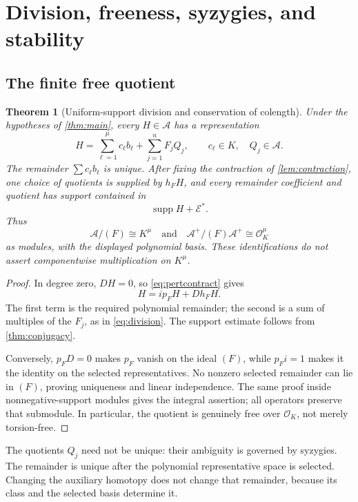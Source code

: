\documentclass[11pt,letterpaper]{article}
\newtheorem{theorem}{Theorem}[section]
\theoremstyle{definition}
\theoremstyle{remark}
\newcommand{\A}{\mathscr A}
\newcommand{\OO}{\mathcal O}
\newcommand{\EE}{\mathcal E}
\newcommand{\supp}{\operatorname{supp}}
\numberwithin{equation}{section}
\begin{document}
\section{Division, freeness, syzygies, and stability}\label{sec:division}
\subsection{The finite free quotient}
\begin{theorem}[Uniform-support division and conservation of colength]\label{thm:division}
Under the hypotheses of \cref{thm:main}, every $H\in\A$ has a representation
\begin{equation}\label{eq:division}
 H=\sum_{\ell=1}^\mu c_\ell b_\ell+\sum_{j=1}^nF_jQ_j,
 \qquad c_\ell\in K,\quad Q_j\in\A.
\end{equation}
The remainder $\sum c_\ell b_\ell$ is unique. After fixing the contraction of \cref{lem:contraction}, one choice of quotients is supplied by $h_FH$, and every remainder coefficient and quotient has support contained in
\begin{equation}\label{eq:supportdivision}
 \supp H+\EE^*.
\end{equation}
Thus
\[
 \A/(F)\cong K^\mu
 \quad\text{and}\quad
 \A^+/(F)\A^+\cong\OO_K^\mu
\]
as modules, with the displayed polynomial basis. These identifications do not assert componentwise multiplication on $K^\mu$.
\end{theorem}
\begin{proof}
In degree zero, $DH=0$, so \eqref{eq:pertcontract} gives
\[
 H=ip_FH+Dh_FH.
\]
The first term is the required polynomial remainder; the second is a sum of multiples of the $F_j$, as in \eqref{eq:division}. The support estimate follows from \cref{thm:conjugacy}.

Conversely, $p_FD=0$ makes $p_F$ vanish on the ideal $(F)$, while $p_Fi=1$ makes it the identity on the selected representatives. No nonzero selected remainder can lie in $(F)$, proving uniqueness and linear independence. The same proof inside nonnegative-support modules gives the integral assertion; all operators preserve that submodule. In particular, the quotient is genuinely free over $\OO_K$, not merely torsion-free.
\end{proof}
The quotients $Q_j$ need not be unique: their ambiguity is governed by syzygies. The remainder is unique after the polynomial representative space is selected. Changing the auxiliary homotopy does not change that remainder, because its class and the selected basis determine it.
\end{document}
